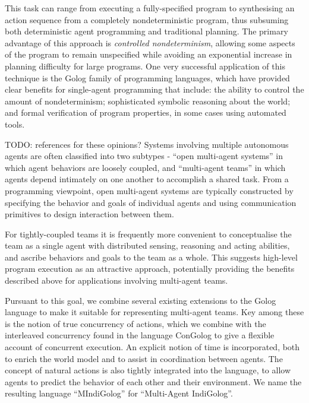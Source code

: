\documentclass[letterpaper]{article}
\begin{document}
This task can range from executing a fully-specified program to synthesising
an action sequence from a completely nondeterministic program, thus
subsuming both deterministic agent programming and traditional planning.
The primary advantage of this approach is \emph{controlled nondeterminism},
allowing some aspects of the program to remain unspecified while avoiding
an exponential increase in planning difficulty for large programs.
One very successful application of this technique is the Golog \cite{levesque97golog}
family of programming languages, which have provided clear benefits
for single-agent programming that include: the ability to control
the amount of nondeterminism; sophisticated symbolic reasoning about
the world; and formal verification of program properties, in some
cases using automated tools.

TODO: references for these opinions? Systems involving multiple autonomous
agents are often classified into two subtypes - ``open multi-agent
systems'' in which agent behaviors are loosely coupled, and ``multi-agent
teams'' in which agents depend intimately on one another to accomplish
a shared task. From a programming viewpoint, open multi-agent systems
are typically constructed by specifying the behavior and goals of
individual agents and using communication primitives to design interaction
between them.

For tightly-coupled teams it is frequently more convenient to conceptualise
the team as a single agent with distributed sensing, reasoning and
acting abilities, and ascribe behaviors and goals to the team as a
whole. This suggests high-level program execution as an attractive
approach, potentially providing the benefits described above for applications
involving multi-agent teams.

Pursuant to this goal, we combine several existing extensions to the
Golog language to make it suitable for representing multi-agent teams.
Key among these is the notion of true concurrency of actions, which
we combine with the interleaved concurrency found in the language
ConGolog \cite{giacomo00congolog} to give a flexible account of concurrent
execution. An explicit notion of time is incorporated, both to enrich
the world model and to assist in coordination between agents. The
concept of natural actions \cite{reiter96sc_nat_conc} is also tightly
integrated into the language, to allow agents to predict the behavior
of each other and their environment. We name the resulting language
``MIndiGolog'' for ``Multi-Agent IndiGolog''.
\end{document}
